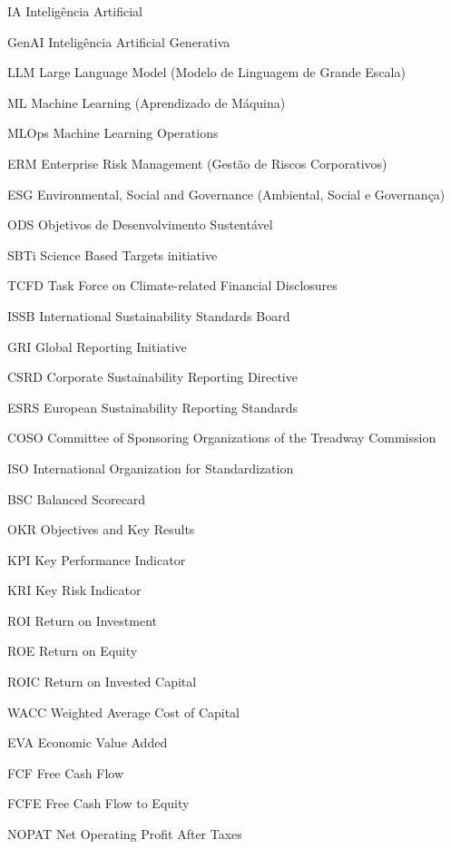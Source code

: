 \begin{siglas}
\item[IA] Inteligência Artificial
\item[GenAI] Inteligência Artificial Generativa
\item[LLM] Large Language Model (Modelo de Linguagem de Grande Escala)
\item[ML] Machine Learning (Aprendizado de Máquina)
\item[MLOps] Machine Learning Operations
\item[ERM] Enterprise Risk Management (Gestão de Riscos Corporativos)
\item[ESG] Environmental, Social and Governance (Ambiental, Social e Governança)
\item[ODS] Objetivos de Desenvolvimento Sustentável
\item[SBTi] Science Based Targets initiative
\item[TCFD] Task Force on Climate-related Financial Disclosures
\item[ISSB] International Sustainability Standards Board
\item[GRI] Global Reporting Initiative
\item[CSRD] Corporate Sustainability Reporting Directive
\item[ESRS] European Sustainability Reporting Standards
\item[COSO] Committee of Sponsoring Organizations of the Treadway Commission
\item[ISO] International Organization for Standardization
\item[BSC] Balanced Scorecard
\item[OKR] Objectives and Key Results
\item[KPI] Key Performance Indicator
\item[KRI] Key Risk Indicator
\item[ROI] Return on Investment
\item[ROE] Return on Equity
\item[ROIC] Return on Invested Capital
\item[WACC] Weighted Average Cost of Capital
\item[EVA] Economic Value Added
\item[FCF] Free Cash Flow
\item[FCFE] Free Cash Flow to Equity
\item[NOPAT] Net Operating Profit After Taxes

\end{siglas}
